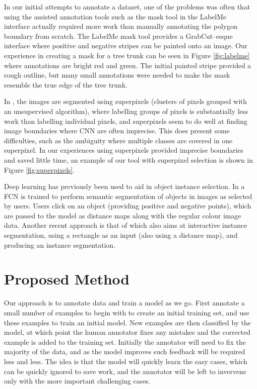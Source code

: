 \documentclass{IEEEtran}
\begin{document}
In our initial attempts to annotate a dataset, one of the problems was often that using the assisted annotation tools such as the mask tool in the LabelMe \cite{Russell2007} interface actually required more work than manually annotating the polygon boundary from scratch. The LabelMe mask tool provides a GrabCut--esque interface where positive and negative stripes can be painted onto an image. Our experience in creating a mask for a tree trunk can be seen in Figure \ref{fig:labelme} where annotations are bright red and green. The initial painted stripe provided a rough outline, but many small annotations were needed to make the mask resemble the true edge of the tree trunk.

In \cite{Galloway2017}, the images are segmented using superpixels (clusters of pixels grouped with an unsupervised algorithm), where labelling groups of pixels is substantially less work than labelling individual pixels, and superpixels seem to do well at finding image boundaries where \gls{CNN} are often imprecise. This does present some difficulties, such as the ambiguity where multiple classes are covered in one superpixel. In our experiences using superpixels provided imprecise boundaries and saved little time, an example of our tool with superpixel selection is shown in Figure \ref{fig:superpixels}.

Deep learning has previously been used to aid in object instance selection. In \cite{Xu2016} a \gls{FCN} is trained to perform semantic segmentation of objects in images as selected by users. Users click on an object (providing positive and negative points), which are passed to the model as distance maps along with the regular colour image data. Another recent approach is that of \cite{Xu2017} which also aims at interactive instance segmentation, using a rectangle as an input (also using a distance map), and producing an instance segmentation.






\section{Proposed Method}

Our approach is to annotate data and train a model as we go. First annotate a small number of examples to begin with to create an initial training set, and use these examples to train an initial model. New examples are then classified by the model, at which point the human annotator fixes any mistakes and the corrected example is added to the training set. Initially the annotator will need to fix the majority of the data, and as the model improves such feedback will be required less and less. The idea is that the model will quickly learn the easy cases, which can be quickly ignored to save work, and the annotator will be left to invervene only with the more important challenging cases.
\end{document}
